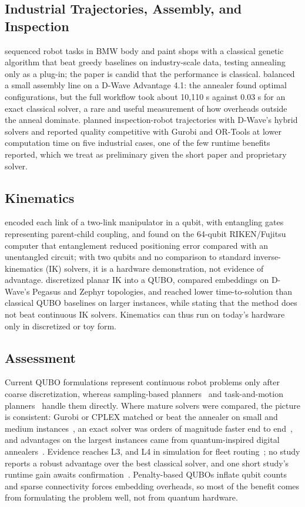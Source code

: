 \documentclass[acmsmall,screen,review]{acmart}
\begin{document}
\subsection{Industrial Trajectories, Assembly, and Inspection}\label{sec:opt-industrial}
\citet{Schuetz2022} sequenced robot tasks in BMW body and paint shops with a classical genetic algorithm that beat greedy baselines on industry-scale data, testing annealing only as a plug-in; the paper is candid that the performance is classical. \citet{Willmann2025} balanced a small assembly line on a D-Wave Advantage 4.1: the annealer found optimal configurations, but the full workflow took about 10,110 s against 0.03 s for an exact classical solver, a rare and useful measurement of how overheads outside the anneal dominate. \citet{Osaba2025} planned inspection-robot trajectories with D-Wave's hybrid solvers and reported quality competitive with Gurobi and OR-Tools at lower computation time on five industrial cases, one of the few runtime benefits reported, which we treat as preliminary given the short paper and proprietary solver.

\subsection{Kinematics}\label{sec:opt-kinematics}
\citet{Otani2025} encoded each link of a two-link manipulator in a qubit, with entangling gates representing parent-child coupling, and found on the 64-qubit RIKEN/Fujitsu computer that entanglement reduced positioning error compared with an unentangled circuit; with two qubits and no comparison to standard inverse-kinematics (IK) solvers, it is a hardware demonstration, not evidence of advantage. \citet{Salloum2026} discretized planar IK into a QUBO, compared embeddings on D-Wave's Pegasus and Zephyr topologies, and reached lower time-to-solution than classical QUBO baselines on larger instances, while stating that the method does not beat continuous IK solvers. Kinematics can thus run on today's hardware only in discretized or toy form.

\subsection{Assessment}\label{sec:opt-assessment}
Current QUBO formulations represent continuous robot problems only after coarse discretization, whereas sampling-based planners~\cite{LaValle1998,Karaman2011} and task-and-motion planners~\cite{Garrett2021} handle them directly. Where mature solvers were compared, the picture is consistent: Gurobi or CPLEX matched or beat the annealer on small and medium instances~\cite{Ohzeki2019,Smierzchalski2024,Leib2023}, an exact solver was orders of magnitude faster end to end~\cite{Willmann2025}, and advantages on the largest instances came from quantum-inspired digital annealers~\cite{Leib2023,Goto2019}. Evidence reaches L3, and L4 in simulation for fleet routing~\cite{Quang2025}; no study reports a robust advantage over the best classical solver, and one short study's runtime gain awaits confirmation~\cite{Osaba2025}. Penalty-based QUBOs inflate qubit counts and sparse connectivity forces embedding overheads, so most of the benefit comes from formulating the problem well, not from quantum hardware.
\end{document}
